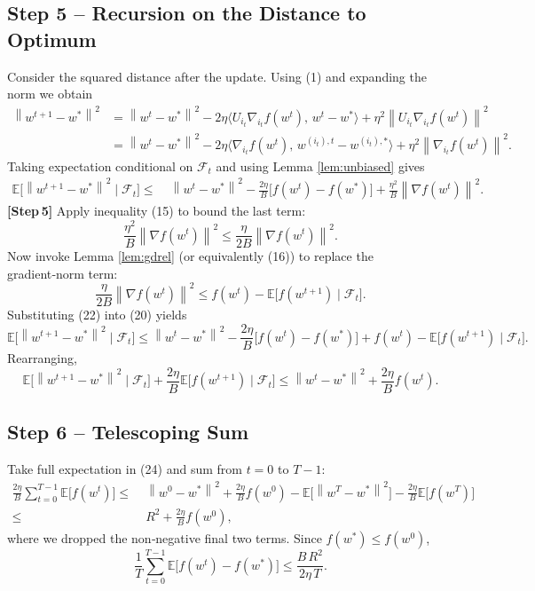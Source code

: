 \documentclass{article}
\newcommand{\E}{\mathbb{E}}
\newcommand{\norm}[1]{\left\lVert#1\right\rVert}
\begin{document}
\subsection*{Step 5 – Recursion on the Distance to Optimum}
Consider the squared distance after the update.
Using (1) and expanding the norm we obtain
\[
\begin{aligned}
\norm{w^{t+1}-w^{*}}^{2}
&=\norm{w^{t}-w^{*}}^{2}
-2\eta\langle U_{i_{t}}\nabla_{i_{t}}f(w^{t}),\,w^{t}-w^{*}\rangle
+\eta^{2}\norm{U_{i_{t}}\nabla_{i_{t}}f(w^{t})}^{2}\\
&=\norm{w^{t}-w^{*}}^{2}
-2\eta\langle \nabla_{i_{t}}f(w^{t}),\,w^{(i_{t}),t}-w^{(i_{t}),*}\rangle
+\eta^{2}\norm{\nabla_{i_{t}}f(w^{t})}^{2}.
\end{aligned}
\tag{19}
\]
Taking expectation conditional on $\mathcal{F}_{t}$ and using Lemma \ref{lem:unbiased} gives
\[
\begin{aligned}
\E\!\bigl[\norm{w^{t+1}-w^{*}}^{2}\mid\mathcal{F}_{t}\bigr]
\le &\;\norm{w^{t}-w^{*}}^{2}
-\frac{2\eta}{B}\bigl[f(w^{t})-f(w^{*})\bigr]
+\frac{\eta^{2}}{B}\norm{\nabla f(w^{t})}^{2}.
\end{aligned}
\tag{20}
\]
\textbf{[Step 5]} Apply inequality (15) to bound the last term:
\[
\frac{\eta^{2}}{B}\norm{\nabla f(w^{t})}^{2}
\le\frac{\eta}{2B}\norm{\nabla f(w^{t})}^{2}.
\tag{21}
\]
Now invoke Lemma \ref{lem:gdrel} (or equivalently (16)) to replace the
gradient‑norm term:
\[
\frac{\eta}{2B}\norm{\nabla f(w^{t})}^{2}
\le f(w^{t})-\E\!\bigl[f(w^{t+1})\mid\mathcal{F}_{t}\bigr].
\tag{22}
\]
Substituting (22) into (20) yields
\[
\E\!\bigl[\norm{w^{t+1}-w^{*}}^{2}\mid\mathcal{F}_{t}\bigr]
\le \norm{w^{t}-w^{*}}^{2}
-\frac{2\eta}{B}\bigl[f(w^{t})-f(w^{*})\bigr]
+f(w^{t})-\E\!\bigl[f(w^{t+1})\mid\mathcal{F}_{t}\bigr].
\tag{23}
\]
Rearranging,
\[
\E\!\bigl[\norm{w^{t+1}-w^{*}}^{2}\mid\mathcal{F}_{t}\bigr]
+\frac{2\eta}{B}\E\!\bigl[f(w^{t+1})\mid\mathcal{F}_{t}\bigr]
\le \norm{w^{t}-w^{*}}^{2}
+\frac{2\eta}{B}f(w^{t}).
\tag{24}
\]

\subsection*{Step 6 – Telescoping Sum}
Take full expectation in (24) and sum from $t=0$ to $T-1$:
\[
\begin{aligned}
\frac{2\eta}{B}\sum_{t=0}^{T-1}\E\!\bigl[f(w^{t})\bigr]
\le &\; \norm{w^{0}-w^{*}}^{2}
+\frac{2\eta}{B}f(w^{0})
-\E\!\bigl[\norm{w^{T}-w^{*}}^{2}\bigr]
-\frac{2\eta}{B}\E\!\bigl[f(w^{T})\bigr]\\
\le &\; R^{2}+\frac{2\eta}{B}f(w^{0}),
\end{aligned}
\tag{25}
\]
where we dropped the non‑negative final two terms.  Since $f(w^{*})\le f(w^{0})$,
\[
\frac{1}{T}\sum_{t=0}^{T-1}\E\!\bigl[f(w^{t})-f(w^{*})\bigr]
\le \frac{B\,R^{2}}{2\eta\,T}.
\tag{26}
\]
\end{document}
